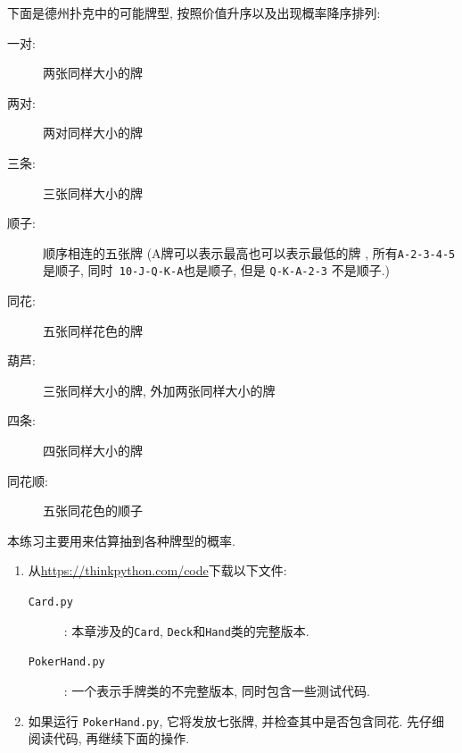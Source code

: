 \documentclass[10pt]{book}
\begin{document}
\begin{exercise}
\label{poker}
下面是德州扑克中的可能牌型, 按照价值升序以及出现概率降序排列:

\begin{description}

\item[一对:] 两张同样大小的牌
\vspace{-0.05in}

\item[两对:] 两对同样大小的牌
\vspace{-0.05in}

\item[三条:] 三张同样大小的牌
\vspace{-0.05in}

\item[顺子:] 顺序相连的五张牌 (A牌可以表示最高也可以表示最低的牌
, 所有{\tt A-2-3-4-5}是顺子, 同时{\tt
10-J-Q-K-A}也是顺子, 但是 {\tt Q-K-A-2-3} 不是顺子.)
\vspace{-0.05in}

\item[同花:] 五张同样花色的牌
\vspace{-0.05in}

\item[葫芦:] 三张同样大小的牌, 外加两张同样大小的牌
\vspace{-0.05in}

\item[四条:] 四张同样大小的牌
\vspace{-0.05in}

\item[同花顺:] 五张同花色的顺子
\vspace{-0.05in}

\end{description}
%
本练习主要用来估算抽到各种牌型的概率.

\begin{enumerate}

\item 从\url{https://thinkpython.com/code}下载以下文件:

\begin{description}

\item[{\tt Card.py}]: 本章涉及的{\tt Card},
{\tt Deck}和{\tt Hand}类的完整版本. 

\item[{\tt PokerHand.py}]: 一个表示手牌类的不完整版本, 同时包含一些测试代码.

\end{description}
%
\item 如果运行 {\tt PokerHand.py}, 它将发放七张牌, 
并检查其中是否包含同花. 先仔细阅读代码, 再继续下面的操作. 


\end{enumerate}
\end{exercise}
\end{document}
